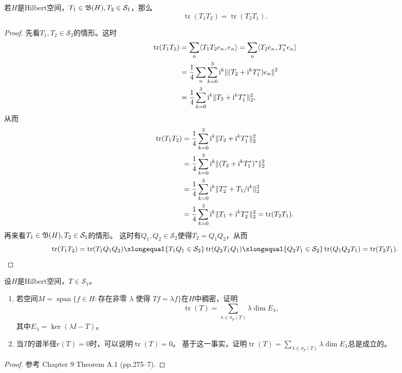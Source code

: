 \begin{8}
    若$H$是Hilbert空间，$T_1\in\mathfrak{B}(H),T_2\in\mathcal{S}_1$，那么
    \[\operatorname{tr}(T_1T_2)=\operatorname{tr}(T_2T_1).\]
\end{8}
\begin{proof}
    先看$T_1,T_2\in\mathcal{S}_2$的情形。这时
    \begin{align*}
        \operatorname{tr}(T_1T_2)&=\sum_n\langle T_1T_2e_n,e_n \rangle
        =\sum_n\langle T_2e_n,T_1^*e_n \rangle\\
        &=\frac{1}{4}\sum_n\sum_{k=0}^3{\rm i}^k\|(T_2+{\rm i}^kT_1^*)e_n\|^2\\
        &=\frac{1}{4}\sum_{k=0}^3{\rm i}^k\|T_2+{\rm i}^kT_1^*\|_2^2,
    \end{align*}
    从而
    \begin{align*}
        \operatorname{tr}(T_1T_2)&=\frac{1}{4}\sum_{k=0}^3{\rm i}^k\|T_2+{\rm i}^kT_1^*\|_2^2\\
        &=\frac{1}{4}\sum_{k=0}^3{\rm i}^k\|(T_2+{\rm i}^kT_1^*)^*\|_2^2\\
        &=\frac{1}{4}\sum_{k=0}^3{\rm i}^k\|T_2^*+T_1/{\rm i}^k\|_2^2\\
        &=\frac{1}{4}\sum_{k=0}^3{\rm i}^k\|T_1+{\rm i}^kT_2^*\|_2^2=\operatorname{tr}(T_2T_1).
    \end{align*}
    再来看$T_1\in\mathfrak{B}(H),T_2\in\mathcal{S}_1$的情形。
    这时有$Q_1,Q_2\in\mathcal{S}_2$使得$T_2=Q_1Q_2$，从而
    \[\operatorname{tr}(T_1T_2)=\operatorname{tr}(T_1Q_1Q_2)
    \xlongequal{T_1Q_1\in\mathcal{S}_2}\operatorname{tr}(Q_2T_1Q_1)
    \xlongequal{Q_2T_1\in\mathcal{S}_2}\operatorname{tr}(Q_1Q_2T_1)
    =\operatorname{tr}(T_2T_1).\qedhere\]
\end{proof}

\begin{9}
    设$H$是Hilbert空间，$T\in\mathcal{S}_1$。
    \begin{enumerate}[label=(\roman*)]
    \item 若空间$M=\operatorname{span}\{f \in H:\text{存在非零 }\lambda
    \text{ 使得 }Tf=\lambda f\}$在$H$中稠密，证明
    \[\operatorname{tr}(T)=\sum_{\lambda\in\sigma_p(T)}\lambda\dim E_\lambda,\]
    其中$E_\lambda=\ker(\lambda I-T)$。
    \item 当$T$的谱半径$r(T)=0$时，可以说明$\operatorname{tr}(T)=0$。
    基于这一事实，证明$\displaystyle\operatorname{tr}(T)
    =\sum_{\lambda\in\sigma_p(T)}\lambda\dim E_\lambda$总是成立的。
    \end{enumerate}
\end{9}
\begin{proof}
    参考\cite{Ta} Chapter 9 Theorem A.1 (pp.275--7).
\end{proof}

